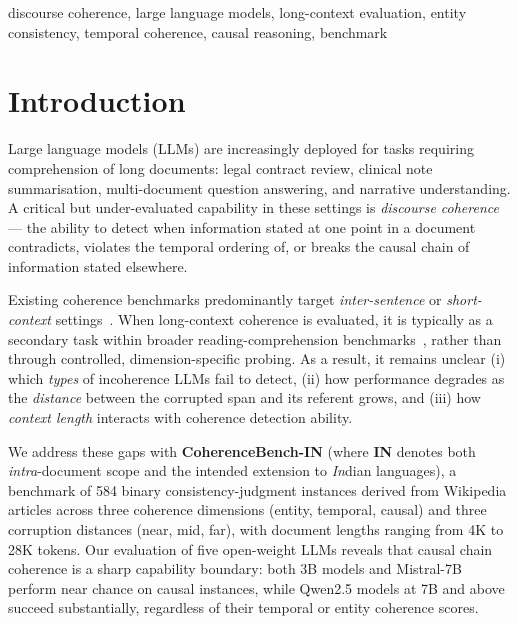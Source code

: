 \documentclass[conference]{IEEEtran}
\begin{document}
\begin{IEEEkeywords}
discourse coherence, large language models, long-context evaluation,
entity consistency, temporal coherence, causal reasoning, benchmark
\end{IEEEkeywords}

\section{Introduction}
Large language models (LLMs) are increasingly deployed for tasks requiring
comprehension of long documents: legal contract review, clinical note summarisation,
multi-document question answering, and narrative understanding.
A critical but under-evaluated capability in these settings is \emph{discourse coherence}---
the ability to detect when information stated at one point in a document
contradicts, violates the temporal ordering of, or breaks the causal chain of
information stated elsewhere.

Existing coherence benchmarks predominantly target \emph{inter-sentence} or
\emph{short-context} settings~\cite{cervone2018,logeswaran2018,tevet2021}.
When long-context coherence is evaluated, it is typically as a secondary task
within broader reading-comprehension benchmarks~\cite{dasigi2021,ho2020},
rather than through controlled, dimension-specific probing.
As a result, it remains unclear (i) which \emph{types} of incoherence LLMs fail to
detect, (ii) how performance degrades as the \emph{distance} between the
corrupted span and its referent grows, and
(iii) how \emph{context length} interacts with coherence detection ability.

We address these gaps with \textbf{CoherenceBench-IN} (where \textbf{IN} denotes both \emph{intra}-document scope and the intended extension to \emph{In}dian languages),
a benchmark of 584 binary consistency-judgment instances
derived from Wikipedia articles across three coherence dimensions
(entity, temporal, causal) and three corruption distances (near, mid, far),
with document lengths ranging from 4K to 28K tokens.
Our evaluation of five open-weight LLMs reveals that
causal chain coherence is a sharp capability boundary:
both 3B models and Mistral-7B perform near chance on causal instances,
while Qwen2.5 models at 7B and above succeed substantially,
regardless of their temporal or entity coherence scores.
\end{document}
